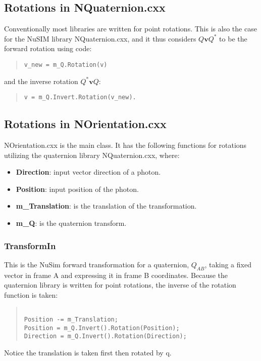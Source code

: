 \subsection{Rotations in NQuaternion.cxx}

Conventionally most libraries are written for point rotations. This is also the case for the NuSIM library NQuaternion.cxx, and it thus considers $Q\mathbf{v}Q^*$ to be the forward rotation using code:
\begin{quotation}
\begin{verbatim}
v_new = m_Q.Rotation(v)
\end{verbatim}
\end{quotation}
and the inverse rotation $Q^*\mathbf{v}Q$:  
\begin{quotation}
\begin{verbatim}
v = m_Q.Invert.Rotation(v_new).
\end{verbatim}
\end{quotation}

\subsection{Rotations in NOrientation.cxx}
NOrientation.cxx is the main class. It has the following functions for rotations utilizing the quaternion library NQuaternion.cxx, where:
\begin{itemize}
\item \textbf{Direction}: input vector direction of a photon.
\item \textbf{Position}: input position of the photon.
\item \textbf{m\_Translation}: is the translation of the transformation.
\item \textbf{m\_Q}: is the quaternion transform.
\end{itemize}

\subsubsection{TransformIn}
This is the NuSim forward transformation for a quaternion, $Q_{AB}$, taking a fixed vector in frame A and expressing it in frame B coordinates. Because the quaternion library is written for point rotations, the inverse of the rotation function is taken: 
\begin{quotation}
\begin{verbatim}

Position -= m_Translation;
Position = m_Q.Invert().Rotation(Position);
Direction = m_Q.Invert().Rotation(Direction);
\end{verbatim}
\end{quotation}
Notice the translation is taken first then rotated by q.
 
